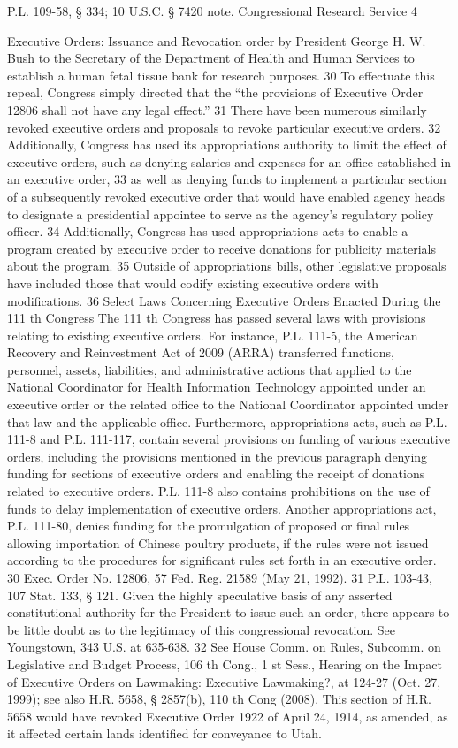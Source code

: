 \documentclass[11pt,a4paper]{article}
\begin{document}
P.L. 109-58, § 334; 10 U.S.C. § 7420 note. Congressional Research Service 4

Executive Orders: Issuance and Revocation order by President George H. W. Bush to the Secretary of the Department of Health and Human Services to establish a human fetal tissue bank for research purposes. 30 To effectuate this repeal, Congress simply directed that the “the provisions of Executive Order 12806 shall not have any legal effect.” 31 There have been numerous similarly revoked executive orders and proposals to revoke particular executive orders. 32 Additionally, Congress has used its appropriations authority to limit the effect of executive orders, such as denying salaries and expenses for an office established in an executive order, 33 as well as denying funds to implement a particular section of a subsequently revoked executive order that would have enabled agency heads to designate a presidential appointee to serve as the agency's regulatory policy officer. 34 Additionally, Congress has used appropriations acts to enable a program created by executive order to receive donations for publicity materials about the program. 35 Outside of appropriations bills, other legislative proposals have included those that would codify existing executive orders with modifications. 36 Select Laws Concerning Executive Orders Enacted During the 111 th Congress The 111 th Congress has passed several laws with provisions relating to existing executive orders. For instance, P.L. 111-5, the American Recovery and Reinvestment Act of 2009 (ARRA) transferred functions, personnel, assets, liabilities, and administrative actions that applied to the National Coordinator for Health Information Technology appointed under an executive order or the related office to the National Coordinator appointed under that law and the applicable office. Furthermore, appropriations acts, such as P.L. 111-8 and P.L. 111-117, contain several provisions on funding of various executive orders, including the provisions mentioned in the previous paragraph denying funding for sections of executive orders and enabling the receipt of donations related to executive orders. P.L. 111-8 also contains prohibitions on the use of funds to delay implementation of executive orders. Another appropriations act, P.L. 111-80, denies funding for the promulgation of proposed or final rules allowing importation of Chinese poultry products, if the rules were not issued according to the procedures for significant rules set forth in an executive order. 30 Exec. Order No. 12806, 57 Fed. Reg. 21589 (May 21, 1992). 31 P.L. 103-43, 107 Stat. 133, § 121. Given the highly speculative basis of any asserted constitutional authority for the President to issue such an order, there appears to be little doubt as to the legitimacy of this congressional revocation. See Youngstown, 343 U.S. at 635-638. 32 See House Comm. on Rules, Subcomm. on Legislative and Budget Process, 106 th Cong., 1 st Sess., Hearing on the Impact of Executive Orders on Lawmaking: Executive Lawmaking?, at 124-27 (Oct. 27, 1999); see also H.R. 5658, § 2857(b), 110 th Cong (2008). This section of H.R. 5658 would have revoked Executive Order 1922 of April 24, 1914, as amended, as it affected certain lands identified for conveyance to Utah. 
\end{document}
